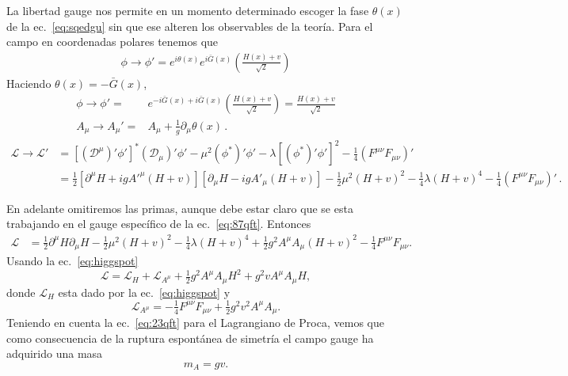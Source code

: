 \begin{frame}
La libertad gauge nos permite en un momento determinado escoger la fase $\theta(x)$ de la ec.~\eqref{eq:sqedgu} sin que ese alteren los observables de la teoría. Para el campo en coordenadas polares tenemos que
\begin{align*}
     \phi\to\phi'=e^{i\theta(x)}e^{i\bar{G}(x)}\left(\frac{H(x)+v}{\sqrt{2}}\right)
\end{align*}
Haciendo $\theta(x)=-\bar{G}(x)$,
\begin{align}
\label{eq:87qft}
   \phi\to\phi'=&e^{-i\bar{G}(x)+i\bar{G}(x)}\left(\frac{H(x)+v}{\sqrt{2}}\right)=\frac{H(x)+v}{\sqrt{2}} \nonumber\\
   A_{\mu}\to A_{\mu}'=&A_{\mu}+\frac{1}{g}\partial_{\mu}\theta(x)\,.
\end{align}
\begin{align}
  \mathcal{L}\to\mathcal{L}' &=\left[\left(\mathcal{D}^\mu\right)'\phi'\right]^*\left(\mathcal{D}_\mu\right)'\phi'-\mu^2\left(\phi^*\right)'\phi'-\lambda\left[\left(\phi^*\right)'\phi'\right]^2-\tfrac{1}{4}\left(F^{\mu\nu}F_{\mu\nu}\right)'\nonumber\\
 &=\tfrac{1}{2}\left[\partial^\mu H+ig{A'}^\mu(H+v)\right]\left[\partial_\mu H-ig{A'}_\mu(H+v)\right]-\tfrac{1}{2}\mu^2(H+v)^2-\tfrac{1}{4}\lambda(H+v)^4-\tfrac{1}{4}\left(F^{\mu\nu}F_{\mu\nu}\right)'\,.
\end{align}

En adelante omitiremos las primas, aunque debe estar claro que se esta trabajando en el gauge específico de la ec.~\eqref{eq:87qft}. Entonces
\begin{align}
  \mathcal{L}&=\tfrac{1}{2}\partial^\mu H\partial_\mu H-\tfrac{1}{2}\mu^2(H+v)^2-
  \tfrac{1}{4}\lambda(H+v)^4+\tfrac{1}{2}g^2A^\mu A_\mu(H+v)^2
  -\tfrac{1}{4}F^{\mu\nu}F_{\mu\nu}.
\end{align}
Usando la ec.~\eqref{eq:higgspot}
\begin{equation}
  \label{eq:94qft}
  \mathcal{L}=\mathcal{L}_H+\mathcal{L}_{A^\mu}+\tfrac{1}{2}g^2A^\mu A_\mu H^2+g^2vA^\mu A_\mu H,
\end{equation}
donde $\mathcal{L}_H$ esta dado por la ec.~\eqref{eq:higgspot} y
\begin{equation}
  \mathcal{L}_{A^\mu}=-\tfrac{1}{4}F^{\mu\nu}F_{\mu\nu}+\tfrac{1}{2}g^2v^2A^\mu A_\mu.
\end{equation}
Teniendo en cuenta la ec.~\eqref{eq:23qft} para el Lagrangiano de Proca, vemos que como consecuencia de la ruptura espontánea de simetría el campo gauge ha adquirido una masa
\begin{equation}
  m_{A}=gv.
\end{equation}


\end{frame}
